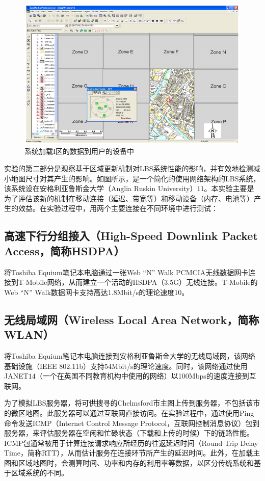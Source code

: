 \documentclass{article}
\begin{document}
\begin{CJK}{UTF8}{gbsn}
	\begin{figure}[htbp]
		\centering
		\includegraphics[bb=0 0 739 479, scale=0.45]{figure/fig05.png}
		\caption{系统加载I区的数据到用户的设备中}
		\label{fig:the-system-loaded-zone-i-into-the-user-s-device}
	\end{figure}

	实验的第二部分是观察基于区域更新机制对LBS系统性能的影响，并有效地检测减小地图尺寸对其产生的影响。如图所示，是一个简化的使用网络架构的LBS系统，该系统设在安格利亚鲁斯金大学（Anglia Ruskin University）$11$。本实验主要是为了评估该新的机制在移动连接（延迟、带宽等）和移动设备（内存、电池等）产生的效益。在实验过程中，用两个主要连接在不同环境中进行测试：

	\subsection{高速下行分组接入（High-Speed Downlink Packet Access，简称HSDPA）}
	将Toshiba Equium笔记本电脑通过一张Web “N” Walk PCMCIA无线数据网卡连接到T-Mobile网络，从而建立一个活动的HSDPA（3.5G）无线连接。T-Mobile的 Web “N” Walk数据网卡支持高达1.8Mbit/s的理论速度$10$。

	\subsection{无线局域网（Wireless Local Area Network，简称WLAN）}
	将Toshiba Equium笔记本电脑连接到安格利亚鲁斯金大学的无线局域网，该网络基础设施（IEEE 802.11b）支持54Mbit/s的理论速度。同时，该网络通过使用JANET$14$（一个在英国不同教育机构中使用的网络）以100Mbps的速度连接到互联网。

	为了模拟LBS服务器，将可供搜寻的Chelmsford市主图上传到服务器，不包括该市的微区地图。此服务器可以通过互联网直接访问。在实验过程中，通过使用Ping命令发送ICMP（Internet Control Message Protocol，互联网控制消息协议）包到服务器，来评估服务器在空闲和忙碌状态（下载和上传的时候）下的链路性能。ICMP包通常被用于计算连接请求响应所经历的往返延迟时间（Round Trip Delay Time，简称RTT），从而估计服务在连接环节所产生的延迟时间。此外，在加载主图和区域地图时，会测算时间、功率和内存的利用率等数据，以区分传统系统和基于区域系统的不同。


\end{CJK}
\end{document}
